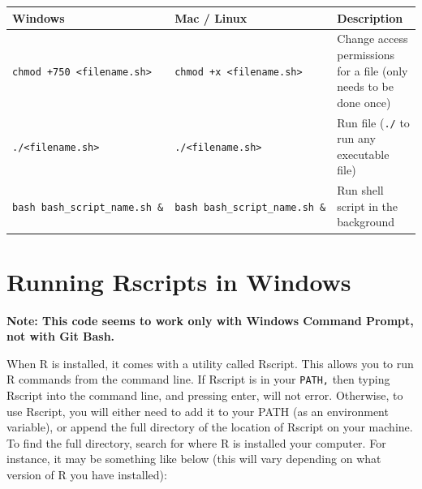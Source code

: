 \documentclass[
]{book}
\begin{document}
\begin{longtable}[]{@{}
  >{\raggedright\arraybackslash}p{}
  >{\raggedright\arraybackslash}p{}
  >{\raggedright\arraybackslash}p{}@{}}
\toprule\noalign{}
\begin{minipage}[b]{\linewidth}\raggedright
Windows
\end{minipage} & \begin{minipage}[b]{\linewidth}\raggedright
Mac / Linux
\end{minipage} & \begin{minipage}[b]{\linewidth}\raggedright
Description
\end{minipage} \\
\midrule\noalign{}
\endhead
\bottomrule\noalign{}
\endlastfoot
\texttt{chmod\ +750\ \textless{}filename.sh\textgreater{}} & \texttt{chmod\ +x\ \textless{}filename.sh\textgreater{}} & Change access permissions for a file (only needs to be done once) \\
\texttt{./\textless{}filename.sh\textgreater{}} & \texttt{./\textless{}filename.sh\textgreater{}} & Run file (\texttt{./} to run any executable file) \\
\texttt{bash\ bash\_script\_name.sh\ \&} & \texttt{bash\ bash\_script\_name.sh\ \&} & Run shell script in the background \\
\end{longtable}

\section{Running Rscripts in Windows}\label{running-rscripts-in-windows}

\textbf{Note: This code seems to work only with Windows Command Prompt, not with Git Bash.}

When R is installed, it comes with a utility called Rscript. This allows you to run R commands from the command line. If Rscript is in your \texttt{PATH,} then typing Rscript into the command line, and pressing enter, will not error. Otherwise, to use Rscript, you will either need to add it to your PATH (as an environment variable), or append the full directory of the location of Rscript on your machine. To find the full directory, search for where R is installed your computer. For instance, it may be something like below (this will vary depending on what version of R you have installed):
\end{document}
